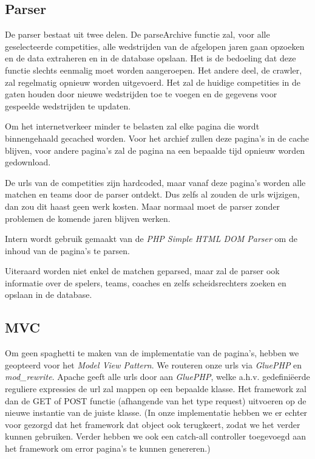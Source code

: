 \documentclass[11pt]{article}
\begin{document}
\subsection{Parser}

De parser bestaat uit twee delen. De parseArchive functie zal, voor alle geselecteerde competities, alle wedstrijden van de afgelopen jaren gaan opzoeken en de data extraheren en in de database opslaan. Het is de bedoeling dat deze functie slechts eenmalig moet worden aangeroepen. Het andere deel, de crawler, zal regelmatig opnieuw worden uitgevoerd. Het zal de huidige competities in de gaten houden door nieuwe wedstrijden toe te voegen en de gegevens voor gespeelde wedstrijden te updaten.

Om het internetverkeer minder te belasten zal elke pagina die wordt binnengehaald gecached worden. Voor het archief zullen deze pagina's in de cache blijven, voor andere pagina's zal de pagina na een bepaalde tijd opnieuw worden gedownload.

De urls van de competities zijn hardcoded, maar vanaf deze pagina's worden alle matchen en teams door de parser ontdekt. Dus zelfs al zouden de urls wijzigen, dan zou dit haast geen werk kosten. Maar normaal moet de parser zonder problemen de komende jaren blijven werken.

Intern wordt gebruik gemaakt van de \emph{PHP Simple HTML DOM Parser} om de inhoud van de pagina's te parsen.

Uiteraard worden niet enkel de matchen geparsed, maar zal de parser ook informatie over de spelers, teams, coaches en zelfs scheidsrechters zoeken en opslaan in de database.


\subsection{MVC}

Om geen spaghetti te maken van de implementatie van de pagina's, hebben we geopteerd voor het \emph{Model View Pattern}. We routeren onze urls via \emph{GluePHP} en \emph{mod\_rewrite}. Apache geeft alle urls door aan \emph{GluePHP}, welke a.h.v. gedefini\"eerde reguliere expressies de url zal mappen op een bepaalde klasse. Het framework zal dan de GET of POST functie (afhangende van het type request) uitvoeren op de nieuwe instantie van de juiste klasse. (In onze implementatie hebben we er echter voor gezorgd dat het framework dat object ook terugkeert, zodat we het verder kunnen gebruiken. Verder hebben we ook een catch-all controller toegevoegd aan het framework om error pagina's te kunnen genereren.)
\end{document}
